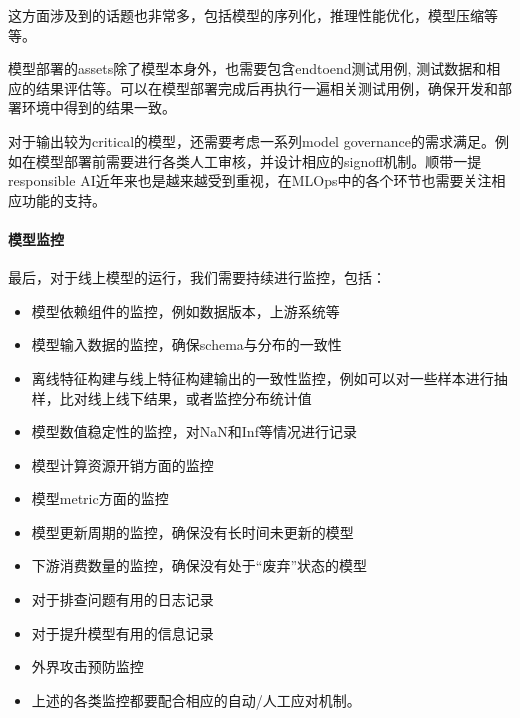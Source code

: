 \documentclass[letterpaper,10pt,english]{sphinxmanual}
\begin{document}
这方面涉及到的话题也非常多，包括模型的序列化，推理性能优化，模型压缩等等。

模型部署的assets除了模型本身外，也需要包含end\sphinxhyphen{}to\sphinxhyphen{}end测试用例,
测试数据和相应的结果评估等。可以在模型部署完成后再执行一遍相关测试用例，确保开发和部署环境中得到的结果一致。

对于输出较为critical的模型，还需要考虑一系列model
governance的需求满足。例如在模型部署前需要进行各类人工审核，并设计相应的sign\sphinxhyphen{}off机制。顺带一提responsible
AI近年来也是越来越受到重视，在MLOps中的各个环节也需要关注相应功能的支持。


\paragraph{模型监控}
\label{\detokenize{chapter_AI_dive/MLOps:id4}}
最后，对于线上模型的运行，我们需要持续进行监控，包括：
\begin{itemize}
\item {} 
模型依赖组件的监控，例如数据版本，上游系统等

\item {} 
模型输入数据的监控，确保schema与分布的一致性

\item {} 
离线特征构建与线上特征构建输出的一致性监控，例如可以对一些样本进行抽样，比对线上线下结果，或者监控分布统计值

\item {} 
模型数值稳定性的监控，对NaN和Inf等情况进行记录

\item {} 
模型计算资源开销方面的监控

\item {} 
模型metric方面的监控

\item {} 
模型更新周期的监控，确保没有长时间未更新的模型

\item {} 
下游消费数量的监控，确保没有处于“废弃”状态的模型

\item {} 
对于排查问题有用的日志记录

\item {} 
对于提升模型有用的信息记录

\item {} 
外界攻击预防监控

\item {} 
上述的各类监控都要配合相应的自动/人工应对机制。

\end{itemize}
\end{document}

